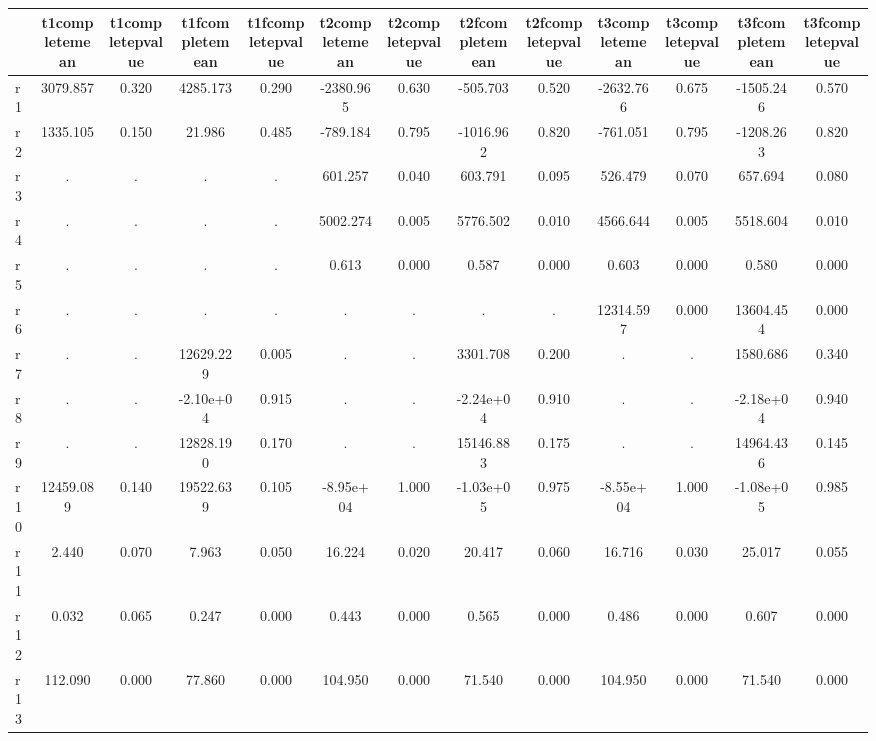 \begin{table}[htbp]
\begin{tabular}{lcccccccccccc} \hline \hline
 & t1completemean  & t1completepvalue  & t1fcompletemean  & t1fcompletepvalue  & t2completemean  & t2completepvalue  & t2fcompletemean  & t2fcompletepvalue  & t3completemean  & t3completepvalue  & t3fcompletemean  & t3fcompletepvalue  \\  \hline 
r1 &  3079.857 &     0.320 &  4285.173 &     0.290 & -2380.965 &     0.630 &  -505.703 &     0.520 & -2632.766 &     0.675 & -1505.246 &     0.570 \\  
r2 &  1335.105 &     0.150 &    21.986 &     0.485 &  -789.184 &     0.795 & -1016.962 &     0.820 &  -761.051 &     0.795 & -1208.263 &     0.820 \\  
r3 &         . &         . &         . &         . &   601.257 &     0.040 &   603.791 &     0.095 &   526.479 &     0.070 &   657.694 &     0.080 \\  
r4 &         . &         . &         . &         . &  5002.274 &     0.005 &  5776.502 &     0.010 &  4566.644 &     0.005 &  5518.604 &     0.010 \\  
r5 &         . &         . &         . &         . &     0.613 &     0.000 &     0.587 &     0.000 &     0.603 &     0.000 &     0.580 &     0.000 \\  
r6 &         . &         . &         . &         . &         . &         . &         . &         . & 12314.597 &     0.000 & 13604.454 &     0.000 \\  
r7 &         . &         . & 12629.229 &     0.005 &         . &         . &  3301.708 &     0.200 &         . &         . &  1580.686 &     0.340 \\  
r8 &         . &         . & -2.10e+04 &     0.915 &         . &         . & -2.24e+04 &     0.910 &         . &         . & -2.18e+04 &     0.940 \\  
r9 &         . &         . & 12828.190 &     0.170 &         . &         . & 15146.883 &     0.175 &         . &         . & 14964.436 &     0.145 \\  
r10 & 12459.089 &     0.140 & 19522.639 &     0.105 & -8.95e+04 &     1.000 & -1.03e+05 &     0.975 & -8.55e+04 &     1.000 & -1.08e+05 &     0.985 \\  
r11 &     2.440 &     0.070 &     7.963 &     0.050 &    16.224 &     0.020 &    20.417 &     0.060 &    16.716 &     0.030 &    25.017 &     0.055 \\  
r12 &     0.032 &     0.065 &     0.247 &     0.000 &     0.443 &     0.000 &     0.565 &     0.000 &     0.486 &     0.000 &     0.607 &     0.000 \\  
r13 &   112.090 &     0.000 &    77.860 &     0.000 &   104.950 &     0.000 &    71.540 &     0.000 &   104.950 &     0.000 &    71.540 &     0.000 \\  
\hline \hline \end{tabular}
\end{table}
